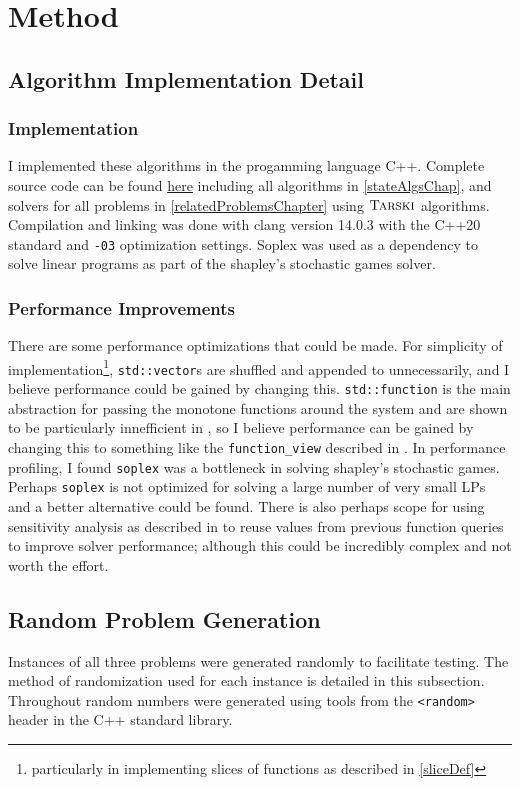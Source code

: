 \section{Method}
\subsection{Algorithm Implementation Detail}
\subsubsection{Implementation}
I implemented these algorithms in the progamming language C++. 
Complete source code can be found \href{https://github.com/angusjoshi/tarski}{here}
including all algorithms in \cref{stateAlgsChap},
and solvers for all problems in \cref{relatedProblemsChapter} using $\textsc{Tarski}$ algorithms.
Compilation and linking was done with
clang version 14.0.3 with the C++20 standard and \lstinline{-03} optimization settings.
Soplex\citep{soplex} was used as a dependency to solve linear programs
as part of the shapley's stochastic games solver.  \\
\subsubsection{Performance Improvements}
There are some performance optimizations that could be made. For simplicity of implementation\footnote{particularly
in implementing slices of functions as described in \cref{sliceDef}},
\lstinline{std::vector}s are shuffled and appended to unnecessarily, and I believe
performance could be gained by changing this. \lstinline{std::function} is the main abstraction for passing
the monotone functions around the system and are shown to be particularly innefficient in \citep{stdFunctionBad},
so I believe performance can be gained by changing this to something like the \lstinline{function_view}
described in \citep{stdFunctionBad}.
In performance profiling, I found \lstinline{soplex} was a bottleneck in solving shapley's stochastic games.
Perhaps \lstinline{soplex} is not optimized for solving a large number of very small LPs and a better alternative could be found.
There is also perhaps scope for using sensitivity
analysis as described in \citep{sensAnalysis} to reuse values from previous function queries to improve
solver performance; although this could be incredibly complex and not worth the effort.

\subsection{Random Problem Generation} \label{randomGen}
Instances of all three problems were generated randomly to facilitate testing. The method of randomization used
for each instance is detailed in this subsection. Throughout random numbers were generated using tools
from the \lstinline{<random>} header in the C++ standard library.
